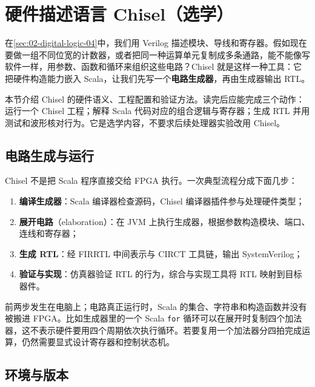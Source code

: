 \section{硬件描述语言 Chisel（选学）}
\label{sec:02-digital-logic-06}

在\cref{sec:02-digital-logic-04}中，我们用 Verilog 描述模块、导线和寄存器。假如现在要做一组不同位宽的计数器，或者把同一种运算单元复制成多条通路，能不能像写软件一样，用参数、函数和循环来组织这些电路？Chisel 就是这样一种工具：它把硬件构造能力嵌入 Scala，让我们先写一个\textbf{电路生成器}，再由生成器输出 RTL。

本节介绍 Chisel 的硬件语义、工程配置和验证方法。读完后应能完成三个动作：运行一个 Chisel 工程；解释 Scala 代码对应的组合逻辑与寄存器；生成 RTL 并用测试和波形核对行为。它是选学内容，不要求后续处理器实验改用 Chisel。

\subsection{电路生成与运行}

Chisel 不是把 Scala 程序直接交给 FPGA 执行。一次典型流程分成下面几步\citep{c02-chisel-book,c02-chisel-stage}：

\begin{enumerate}
  \item \textbf{编译生成器}：Scala 编译器检查源码，Chisel 编译器插件参与处理硬件类型；
  \item \textbf{展开电路}（elaboration）：在 JVM 上执行生成器，根据参数构造模块、端口、连线和寄存器；
  \item \textbf{生成 RTL}：经 FIRRTL 中间表示与 CIRCT 工具链，输出 SystemVerilog；
  \item \textbf{验证与实现}：仿真器验证 RTL 的行为，综合与实现工具将 RTL 映射到目标器件。
\end{enumerate}

前两步发生在电脑上；电路真正运行时，Scala 的集合、字符串和构造函数并没有被搬进 FPGA。比如生成器里的一个 Scala \texttt{for} 循环可以在展开时复制四个加法器，这不表示硬件要用四个周期依次执行循环。若要复用一个加法器分四拍完成运算，仍然需要显式设计寄存器和控制状态机。


\subsection{环境与版本}


